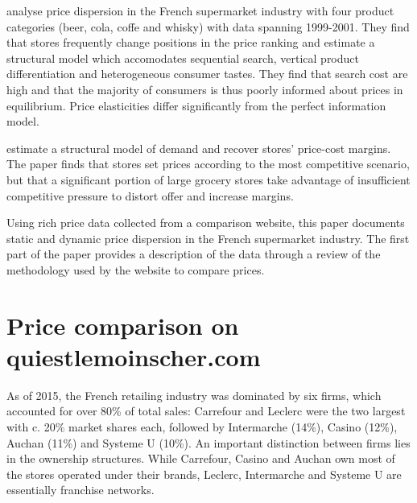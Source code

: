 \documentclass[english]{article}
\begin{document}
\cite{PER15} analyse price dispersion in the French supermarket industry with four product categories (beer, cola, coffe and whisky) with data spanning 1999-2001. They find that stores frequently change positions in the price ranking and estimate a structural model which accomodates sequential search, vertical product differentiation and heterogeneous consumer tastes. They find that search cost are high and that the majority of consumers is thus poorly informed about prices in equilibrium. Price elasticities differ significantly from the perfect information model.

\cite{TUR16} estimate a structural model of demand and recover stores' price-cost margins. The paper finds that stores set prices according to the most competitive scenario, but that a significant portion of large grocery stores take advantage of insufficient competitive pressure to distort offer and increase margins.

Using rich price data collected from a comparison website, this paper documents static and dynamic price dispersion in the French supermarket industry. The first part of the paper provides a description of the data through a review of the methodology used by the website to compare prices.

\section{Price comparison on quiestlemoinscher.com}

As of 2015, the French retailing industry was dominated by six firms, which accounted for over 80\% of total sales: Carrefour and Leclerc were the two largest with c. 20\% market shares each, followed by Intermarche (14\%), Casino (12\%), Auchan (11\%) and Systeme U (10\%). An important distinction between firms lies in the ownership structures. While Carrefour, Casino and Auchan own most of the stores operated under their brands, Leclerc, Intermarche and Systeme U are essentially franchise networks.
\end{document}
